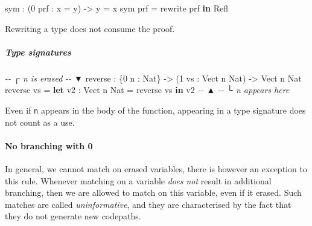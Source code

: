 \documentclass[
]{article}
\newenvironment{Shaded}{}{}
\newcommand{\CommentTok}[1]{\textcolor[rgb]{0.38,0.63,0.69}{\textit{#1}}}
\newcommand{\DataTypeTok}[1]{\textcolor[rgb]{0.56,0.13,0.00}{#1}}
\newcommand{\DecValTok}[1]{\textcolor[rgb]{0.25,0.63,0.44}{#1}}
\newcommand{\FunctionTok}[1]{\textcolor[rgb]{0.02,0.16,0.49}{#1}}
\newcommand{\KeywordTok}[1]{\textcolor[rgb]{0.00,0.44,0.13}{\textbf{#1}}}
\newcommand{\NormalTok}[1]{#1}
\newcommand{\OperatorTok}[1]{\textcolor[rgb]{0.40,0.40,0.40}{#1}}
\newcommand{\OtherTok}[1]{\textcolor[rgb]{0.00,0.44,0.13}{#1}}
\begin{document}
\begin{Shaded}
\begin{Highlighting}[]
\NormalTok{sym }\OperatorTok{:}\NormalTok{ (}\DecValTok{0}\NormalTok{ prf }\OperatorTok{:}\NormalTok{ x }\OtherTok{=}\NormalTok{ y) }\OtherTok{{-}\textgreater{}}\NormalTok{ y }\OtherTok{=}\NormalTok{ x}
\NormalTok{sym prf }\OtherTok{=}\NormalTok{ rewrite prf }\KeywordTok{in} \DataTypeTok{Refl}
\end{Highlighting}
\end{Shaded}

Rewriting a type does not consume the proof.

\hypertarget{type-signatures}{%
\subparagraph{Type signatures}\label{type-signatures}}

\begin{Shaded}
\begin{Highlighting}[]
\CommentTok{{-}{-}          ┌ \textasciigrave{}n\textasciigrave{} is erased}
\CommentTok{{-}{-}          ▼}
\NormalTok{reverse\textquotesingle{} }\OperatorTok{:}\NormalTok{ \{}\DecValTok{0}\NormalTok{ n }\OperatorTok{:} \DataTypeTok{Nat}\NormalTok{\} }\OtherTok{{-}\textgreater{}}\NormalTok{ (}\DecValTok{1}\NormalTok{ vs }\OperatorTok{:} \DataTypeTok{Vect}\NormalTok{ n }\DataTypeTok{Nat}\NormalTok{) }\OtherTok{{-}\textgreater{}} \DataTypeTok{Vect}\NormalTok{ n }\DataTypeTok{Nat}
\NormalTok{reverse\textquotesingle{} vs }\OtherTok{=} \KeywordTok{let}\NormalTok{ v2 }\OperatorTok{:} \DataTypeTok{Vect}\NormalTok{ n }\DataTypeTok{Nat} \OtherTok{=} \FunctionTok{reverse}\NormalTok{ vs }\KeywordTok{in}\NormalTok{ v2}
\CommentTok{{-}{-}                          ▲}
\CommentTok{{-}{-}                          └ \textasciigrave{}n\textasciigrave{} appears here}
\end{Highlighting}
\end{Shaded}

Even if \texttt{n} appears in the body of the function, appearing in a
type signature does not count as a use.

\hypertarget{no-branching-with-0}{%
\paragraph{No branching with 0}\label{no-branching-with-0}}

In general, we cannot match on erased variables, there is however an
exception to this rule. Whenever matching on a variable \emph{does not}
result in additional branching, then we are allowed to match on this
variable, even if it erased. Such matches are called
\emph{uninformative}, and they are characterised by the fact that they
do not generate new codepaths.
\end{document}
